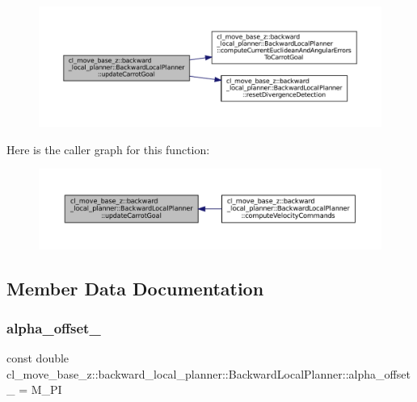 \nopagebreak
\begin{figure}[H]
\begin{center}
\leavevmode
\includegraphics[width=350pt]{classcl__move__base__z_1_1backward__local__planner_1_1BackwardLocalPlanner_a16e79a1b4c0f18879f6f0a8ba67103fd_cgraph}
\end{center}
\end{figure}
Here is the caller graph for this function\+:
\nopagebreak
\begin{figure}[H]
\begin{center}
\leavevmode
\includegraphics[width=350pt]{classcl__move__base__z_1_1backward__local__planner_1_1BackwardLocalPlanner_a16e79a1b4c0f18879f6f0a8ba67103fd_icgraph}
\end{center}
\end{figure}


\subsection{Member Data Documentation}
\mbox{\label{classcl__move__base__z_1_1backward__local__planner_1_1BackwardLocalPlanner_a09765b08935d9355447c44776e1b1c3a}} 
\subsubsection{\texorpdfstring{alpha\+\_\+offset\+\_\+}{alpha\_offset\_}}
{\footnotesize\ttfamily const double cl\+\_\+move\+\_\+base\+\_\+z\+::backward\+\_\+local\+\_\+planner\+::\+Backward\+Local\+Planner\+::alpha\+\_\+offset\+\_\+ = M\+\_\+\+PI\hspace{0.3cm}{\ttfamily [private]}}



